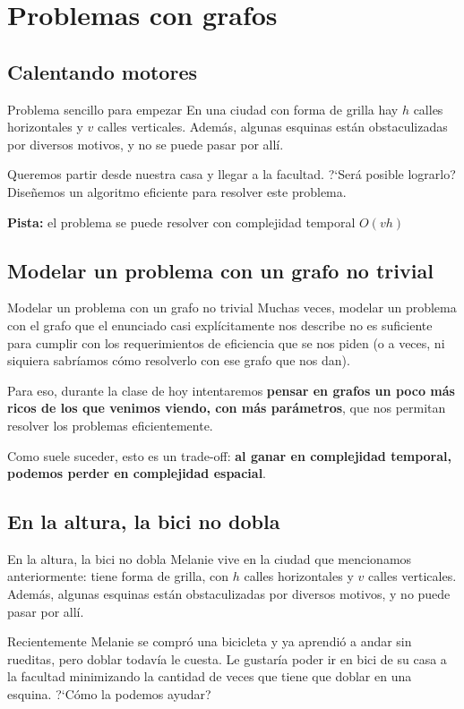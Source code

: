 \documentclass[compress]{beamer}
\begin{document}
\section{Problemas con grafos}
\subsection{Calentando motores}
\begin{frame}{Problema sencillo para empezar}
En una ciudad con forma de grilla hay $h$ calles horizontales y $v$ calles verticales. Adem\'as, algunas esquinas est\'an obstaculizadas por diversos motivos, y no se puede pasar por all\'i.\bigskip

Queremos partir desde nuestra casa y llegar a la facultad. ?`Ser\'a posible lograrlo? \\ Dise\~nemos un algoritmo eficiente para resolver este problema. \bigskip

{\bf Pista:} el problema se puede resolver con complejidad temporal $O(v h)$

\end{frame}

\subsection{Modelar un problema con un grafo no trivial}
\begin{frame}{Modelar un problema con un grafo no trivial}
Muchas veces, modelar un problema con el grafo que el enunciado casi expl\'icitamente nos describe no es suficiente para cumplir con los requerimientos de eficiencia que se nos piden (o a veces, ni siquiera sabr\'iamos c\'omo resolverlo con ese grafo que nos dan).\bigskip

Para eso, durante la clase de hoy intentaremos {\bf pensar en grafos un poco m\'as ricos de los que venimos viendo, con m\'as par\'ametros}, que nos permitan resolver los problemas eficientemente. \bigskip

Como suele suceder, esto es un trade-off: {\bf al ganar en complejidad temporal, podemos perder en complejidad espacial}.
\end{frame}

\subsection{En la altura, la bici no dobla}
\begin{frame}{En la altura, la bici no dobla}
Melanie vive en la ciudad que mencionamos anteriormente: tiene forma de grilla, con $h$ calles horizontales y $v$ calles verticales. Adem\'as, algunas esquinas est\'an obstaculizadas por diversos motivos, y no puede pasar por all\'i.\bigskip

Recientemente Melanie se compr\'o una bicicleta y ya aprendi\'o a andar sin rueditas, pero doblar todav\'ia le cuesta. Le gustar\'ia poder ir en bici de su casa a la facultad minimizando la cantidad de veces que tiene que doblar en una esquina.
?`C\'omo la podemos ayudar? \bigskip
\end{frame}
\end{document}
